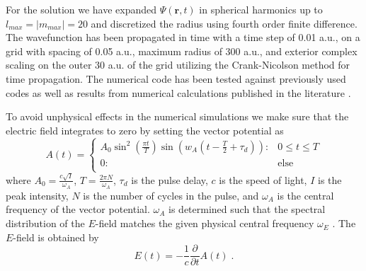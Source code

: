 For the solution we have expanded $\Psi(\mathbf{r},t)$ in spherical harmonics up to $l_{max} = |m_{max}| = 20$ and discretized the radius using fourth order finite difference. The wavefunction has been propagated in time with a time step of 0.01 a.u., on a grid with spacing of 0.05 a.u., maximum radius of 300 a.u., and exterior complex scaling on the outer 30 a.u. of the grid utilizing the Crank-Nicolson method for time propagation. The numerical code has been tested against previously used codes as well as results from numerical calculations published in the literature \cite{Scrinzi2010}.

To avoid unphysical effects in the numerical simulations we make sure that the electric field integrates to zero by setting the vector potential as \cite{chelkowski_sensitivity_2002}
%
\begin{equation}
A(t) = \begin{cases} 
      A_0 \sin^2\left(\frac{\pi t}{T}\right)\sin(w_A(t-\frac{T}{2}+\tau_d)): & 0\leq t \leq T \\
      0: & \mbox{else} \\
   \end{cases} 
\end{equation}
%
where $A_0 = \frac{c\sqrt{I}}{\omega_A}$, $T = \frac{2\pi N}{\omega_A}$, $\tau_d$ is the pulse delay, $c$ is the speed of light, $I$ is the peak intensity, $N$ is the number of cycles in the pulse, and $\omega_A$ is the central frequency of the vector potential. $\omega_A$ is determined such that the spectral distribution of the $E$-field matches the given physical central frequency $\omega_E$ \cite{venzke_central_2018}. The $E$-field is obtained by
%
\begin{equation}
    E(t) = -\frac{1}{c}\frac{\partial}{\partial t}A(t)\; .
\end{equation}

